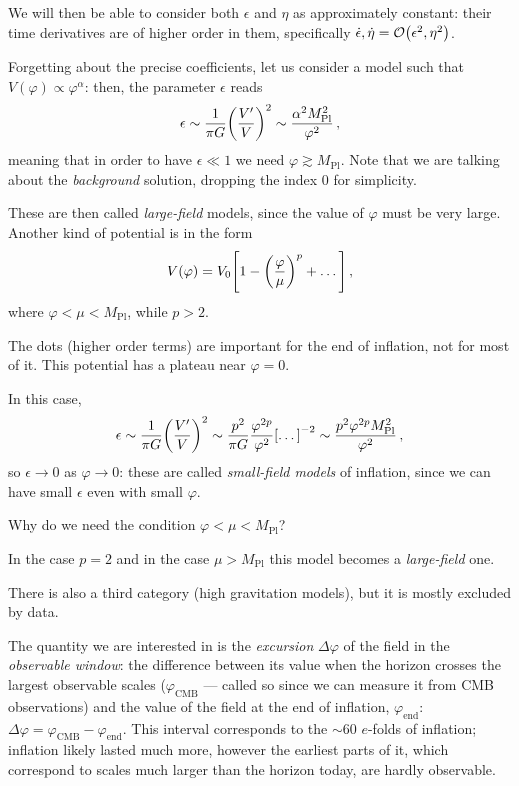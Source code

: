 \documentclass[main.tex]{subfiles}
\begin{document}
We will then be able to consider both \(\epsilon \) and \(\eta\) as approximately constant: their time derivatives are of higher order in them, specifically \(\dot{\epsilon}, \dot{\eta} = \order{\epsilon^2, \eta^2}\).

Forgetting about the precise coefficients, let us consider a model such that \(V(\varphi ) \propto \varphi^{\alpha }\): then, the parameter \(\epsilon \) reads
%
\begin{align}
\epsilon \sim \frac{1}{\pi G} \qty(\frac{V'}{V})^2 \sim \frac{\alpha^2 M _{\text{Pl}}^2}{\varphi^2}
\,,
\end{align}
%
meaning that in order to have \(\epsilon \ll 1\) we need \(\varphi \gtrsim M _{\text{Pl}}\). 
Note that we are talking about the \emph{background} solution, dropping the index \(0\) for simplicity.

These are then called \emph{large-field} models, since the value of \(\varphi \) must be very large. 
Another kind of potential is in the form 
%
\begin{align}
V(\varphi ) = V_0 \qty[1 - \qty(\frac{\varphi }{\mu })^{p } + \dots]
\,,
\end{align}
%
where \(\varphi < \mu < M _{\text{Pl}}\), while \(p > 2\). 

The dots (higher order terms) are important for the end of inflation, not for most of it. 
This potential has a plateau near \(\varphi = 0\).

In this case, 
%
\begin{align}
\epsilon \sim \frac{1}{\pi G} \qty(\frac{V'}{V})^2
\sim \frac{p^2}{\pi G} \frac{\varphi^{2 p }}{\varphi^2}  \qty[\dots]^{-2} 
\sim \frac{p^2 \varphi^{2p} M _{\text{Pl}}^2}{\varphi^2} 
\,,
\end{align}
%
so \(\epsilon \to 0\) as \(\varphi \to 0\): these are called \emph{small-field models} of inflation, since we can have small \(\epsilon \) even with small \(\varphi \).

Why do we need the condition \(\varphi < \mu < M _{\text{Pl}}\)? 

\begin{claim}
In the case \(p = 2\) and in the case \(\mu > M _{\text{Pl}}\) this model becomes a \emph{large-field} one. 
\end{claim}

There is also a third category (high gravitation models), but it is mostly excluded by data. 

The quantity we are interested in is the \emph{excursion} \(\Delta \varphi \) of the field in the \emph{observable window}: the difference between its value when the horizon crosses the largest observable scales (\(\varphi _{\text{CMB}}\) --- called so since we can measure it from CMB observations) and the value of the field at the end of inflation, \(\varphi _{\text{end}}\): \(\Delta \varphi = \varphi _{\text{CMB}} - \varphi _{\text{end}}\). 
This interval corresponds to the \(\sim 60\) \(e\)-folds of inflation; inflation likely lasted much more, however the earliest parts of it, which correspond to scales much larger than the horizon today, are hardly observable. 
\end{document}
